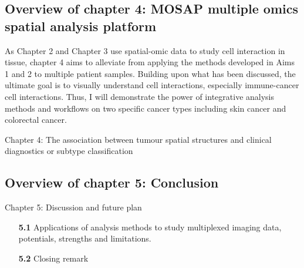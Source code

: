\subsection{Overview of chapter 4: MOSAP multiple omics spatial analysis platform}
As Chapter 2 and Chapter 3 use spatial-omic data to study cell interaction in tissue, chapter 4 aims to alleviate from applying the methods developed in Aims 1 and 2 to multiple patient samples. Building upon what has been discussed, the ultimate goal is to visually understand cell interactions, especially immune-cancer cell interactions. Thus, I will demonstrate the power of integrative analysis methods and workflows on two specific cancer types including skin cancer and colorectal cancer.

Chapter 4: The association between tumour spatial structures and clinical diagnostics or subtype classification


\subsection{Overview of chapter 5: Conclusion}
Chapter 5: Discussion and future plan
\begin{enumerate}[align=left]
    \item[\textbf{5.1}] Applications of analysis methods to study multiplexed imaging data, potentials, strengths and limitations. 
    \item[\textbf{5.2}] Closing remark
\end{enumerate}


% 
% 
